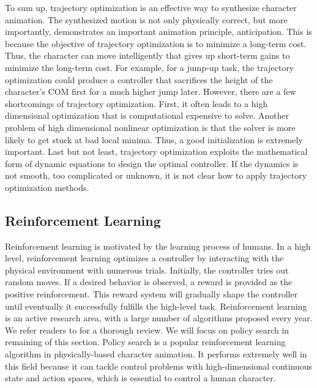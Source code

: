 To sum up, trajectory optimization is an effective way to synthesize character animation. The synthesized motion is not only physically correct, but more importantly, demonstrates an important animation principle, anticipation. This is because the objective of trajectory optimization is to minimize a long-term cost. Thus, the character can move intelligently that gives up short-term gains to minimize the long-term cost. For example, for a jump-up task, the trajectory optimization could produce a controller that sacrifices the height of the character's COM first for a much higher jump later. However, there are a few shortcomings of trajectory optimization. First, it often leads to a high dimensional optimization that is computational expensive to solve. Another problem of high dimensional nonlinear optimization is that the solver is more likely to get stuck at bad local minima. Thus, a good initialization is extremely important. Last but not least, trajectory optimization exploits the mathematical form of dynamic equations to design the optimal controller. If the dynamics is not smooth, too complicated or unknown, it is not clear how to apply trajectory optimization methods.


\subsection{Reinforcement Learning}
Reinforcement learning is motivated by the learning process of humans. In a high level, reinforcement learning optimizes a controller by interacting with the physical environment with numerous trials. Initially, the controller tries out random moves. If a desired behavior is observed, a reward is provided as the positive reinforcement. This reward system will gradually shape the controller until eventually it successfully fulfills the high-level task. Reinforcement learning is an active research area, with a large number of algorithms proposed every year. We refer readers to \cite{Kaelbling1996,Bagnell:2013} for a thorough review. We will focus on policy search in remaining of this section. Policy search is a popular reinforcement learning algorithm in physically-based character animation. It performs extremely well in this field because it can tackle control problems with high-dimensional continuous state and action spaces, which is essential to control a human character. 


